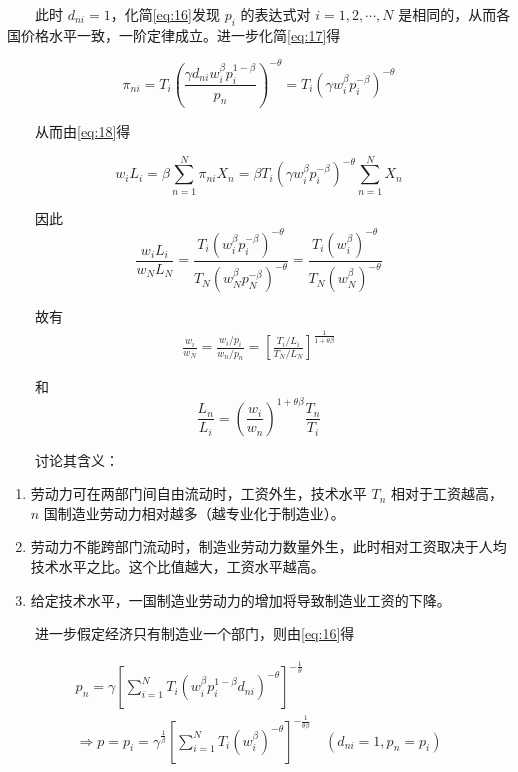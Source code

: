 \documentclass[
]{article}
\providecommand{\tightlist}{%
  \setlength{\itemsep}{0pt}\setlength{\parskip}{0pt}}
\begin{document}
　　此时 \(d_{ni}=1\)，化简\eqref{eq:16}发现 \(p_i\) 的表达式对 \(i=1,2,\cdots,N\) 是相同的，从而各国价格水平一致，一阶定律成立。进一步化简\eqref{eq:17}得

\[\pi_{n i}=T_{i}\left(\frac{\gamma d_{n i} w_{i}^{\beta} p_{i}^{1-\beta}}{p_{n}}\right)^{-\theta}=T_{i}\left(\gamma w_{i}^{\beta} p_{i}^{-\beta}\right)^{-\theta}\]

　　从而由\eqref{eq:18}得

\[
w_{i} L_{i}=\beta \sum_{n=1}^{N} \pi_{n i} X_{n}=\beta T_{i}\left(\gamma w_{i}^{\beta} p_{i}^{-\beta}\right)^{-\theta} \sum_{n=1}^{N} X_{n}
\]

　　因此
\[\frac{w_{i} L_{i}}{w_{N} L_{N}}=\frac{T_{i}\left(w_{i}^{\beta} p_{i}^{-\beta}\right)^{-\theta}}{T_{N}\left(w_{N}^{\beta} p_{N}^{-\beta}\right)^{-\theta}}=\frac{T_{i}\left(w_{i}^{\beta}\right)^{-\theta}}{T_{N}\left(w_{N}^{\beta}\right)^{-\theta}}\]

　　故有
\begin{align}
\frac{w_{i}}{w_{N}}=\frac{w_i/p_i}{w_n/p_n}=\left[\frac{T_{i} / L_{i}}{T_{N} / L_{N}}\right]^{\frac{1}{1+\theta \beta}} \label{eq:22}
\end{align}

　　和
\[\frac{L_n}{L_i}=\left(\frac{w_i}{w_n}\right)^{1+\theta\beta}\frac{T_n}{T_i}\]

　　讨论其含义：

\begin{enumerate}
\def\labelenumi{\arabic{enumi}.}
\tightlist
\item
  劳动力可在两部门间自由流动时，工资外生，技术水平 \(T_n\) 相对于工资越高，\(n\) 国制造业劳动力相对越多（越专业化于制造业）。\\
\item
  劳动力不能跨部门流动时，制造业劳动力数量外生，此时相对工资取决于人均技术水平之比。这个比值越大，工资水平越高。
\item
  给定技术水平，一国制造业劳动力的增加将导致制造业工资的下降。
\end{enumerate}

　　进一步假定经济只有制造业一个部门，则由\eqref{eq:16}得

\[
\begin{array}{l}{p_{n}=\gamma\left[\sum_{i=1}^{N} T_{i}\left(w_{i}^{\beta} p_{i}^{1-\beta} d_{n i}\right)^{-\theta}\right]^{-\frac{1}{\theta}}} \\ {\Rightarrow p=p_{i}=\gamma^{\frac{1}{\beta}}\left[\sum_{i=1}^{N} T_{i}\left(w_{i}^{\beta}\right)^{-\theta}\right]^{-\frac{1}{\theta \beta}} \quad\left(d_{n i}=1, p_{n}=p_{i}\right)}\end{array}
\]
\end{document}
